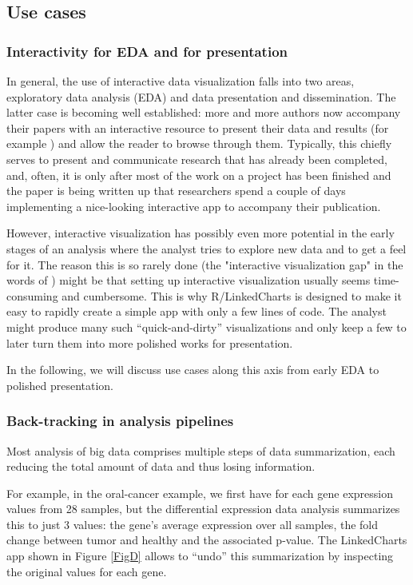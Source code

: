 \documentclass[twocolumn,10pt]{article}
\begin{document}
\subsection{Use cases}

\subsubsection{Interactivity for EDA and for presentation}

In general, the use of interactive data visualization falls into two areas, exploratory data analysis (EDA) and data presentation and dissemination. The latter case is becoming well established: more and more authors now accompany their papers with an interactive resource to present their data and results (for example \cite{travaglini_2020, roider_2020, kalucka_2020}) and allow the reader to browse through them. Typically, this chiefly serves to present and communicate research that has already been completed, and, often, it is only after most of the work on a project has been finished and the paper is being written up that researchers spend a couple of days implementing a nice-looking interactive app to accompany their publication.

However, interactive visualization has possibly even more potential in the early stages of an analysis where the analyst tries to explore new data and to get a feel for it. The reason this is so rarely done (the "interactive visualization gap" in the words of \citet{batch_2017}) might be that setting up interactive visualization usually seems time-consuming and cumbersome. This is why R/LinkedCharts is designed to make it easy to rapidly create a simple app with only a few lines of code. The analyst might produce many such ``quick-and-dirty'' visualizations and only keep a few to later turn them into more polished works for presentation.

In the following, we will discuss use cases along this axis from early EDA to polished presentation.


\subsubsection{Back-tracking in analysis pipelines}

Most analysis of big data comprises multiple steps of data summarization, each reducing the total amount of data and thus losing information.

For example, in the oral-cancer example, we first have for each gene expression values from 28 samples, but the differential expression data analysis summarizes this to just 3 values: the gene's average expression over all samples, the fold change between tumor and healthy and the associated p-value. The LinkedCharts app shown in Figure \ref{FigD} allows to ``undo'' this summarization by inspecting the original values for each gene.
\end{document}
